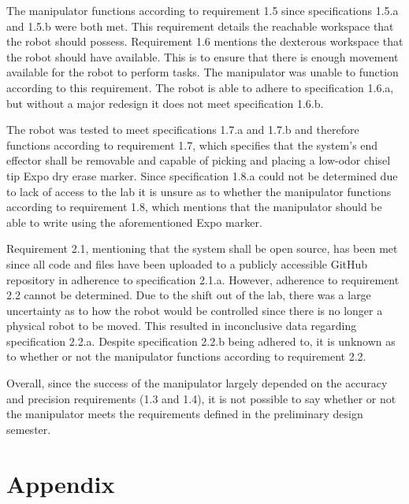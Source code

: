 The manipulator functions according to requirement 1.5 since specifications 1.5.a and 1.5.b were both met. This requirement details the reachable workspace that the robot should possess. Requirement 1.6 mentions the dexterous workspace that the robot should have available. This is to ensure that there is enough movement available for the robot to perform tasks. The manipulator was unable to function according to this requirement. The robot is able to adhere to specification 1.6.a, but without a major redesign it does not meet specification 1.6.b.

The robot was tested to meet specifications 1.7.a and 1.7.b and therefore functions according to requirement 1.7, which specifies that the system’s end effector shall be removable and capable of picking and placing a low-odor chisel tip Expo dry erase marker. Since specification 1.8.a could not be determined due to lack of access to the lab it is unsure as to whether the manipulator functions according to requirement 1.8, which mentions that the manipulator should be able to write using the aforementioned Expo marker.

Requirement 2.1, mentioning that the system shall be open source, has been met since all code and files have been uploaded to a publicly accessible GitHub repository in adherence to specification 2.1.a. However, adherence to  requirement 2.2 cannot be determined. Due to the shift out of the lab, there was a large uncertainty as to how the robot would be controlled since there is no longer a physical robot to be moved. This resulted in inconclusive data regarding specification 2.2.a. Despite specification 2.2.b being adhered to, it is unknown as to whether or not the manipulator functions according to requirement 2.2.

Overall, since the success of the manipulator largely depended on the accuracy and precision requirements (1.3 and 1.4), it is not possible to say whether or not the manipulator meets the requirements defined in the preliminary design semester.




\null\newpage\null\newpage
% 
\appendix
\renewcommand\thesection{\Roman{section}}
\renewcommand\thesubsection{\roman{subsection}}
\section*{Appendix}\label{sec:app}


